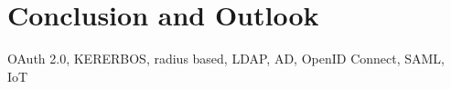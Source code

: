 \chapter{Conclusion and Outlook}

OAuth 2.0, KERERBOS, radius based, LDAP, AD, OpenID Connect, SAML, IoT